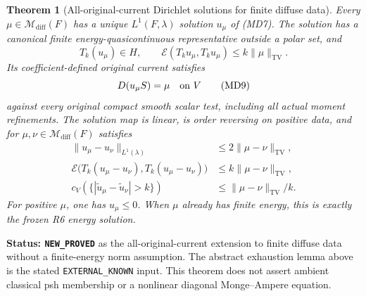 \documentclass[11pt,a4paper]{article}
\numberwithin{equation}{section}
\newtheorem{theorem}{Theorem}[section]
\theoremstyle{definition}
\theoremstyle{remark}
\begin{document}
\begin{theorem}[All-original-current Dirichlet solutions for finite diffuse data]
\label{thm:r11-diffuse-transposition-dirichlet}
Every $\mu\in\mathcal M_{\mathrm{diff}}(F)$ has a unique
$L^1(F,\lambda)$ solution $u_\mu$ of (MD7).  The solution has
a canonical finite energy-quasicontinuous representative
outside a polar set, and
\[
       T_k(u_\mu)\in H,\qquad
       \mathcal E(T_ku_\mu,T_ku_\mu)\leq k\|\mu\|_{\mathrm{TV}}.
 \tag{MD8}
\]
Its coefficient-defined original current satisfies
\[
                         D(u_\mu S)=\mu\quad\hbox{on }V
 \tag{MD9}
\]
against every original compact smooth scalar test, including
all actual moment refinements.
The solution map is linear, is order reversing on positive data,
and for $\mu,\nu\in\mathcal M_{\mathrm{diff}}(F)$ satisfies
\[
 \begin{split}
 \|u_\mu-u_\nu\|_{L^1(\lambda)}
                   &\leq2\|\mu-\nu\|_{\mathrm{TV}},\\
 \mathcal E\bigl(T_k(u_\mu-u_\nu),T_k(u_\mu-u_\nu)\bigr)
                   &\leq k\|\mu-\nu\|_{\mathrm{TV}},\\
 c_V(\{|\widetilde u_\mu-\widetilde u_\nu|>k\})
                   &\leq\|\mu-\nu\|_{\mathrm{TV}}/k.
 \end{split}
 \tag{MD10}
\]
For positive $\mu$, one has $u_\mu\leq0$.
When $\mu$ already has finite energy, this is exactly the
frozen R6 energy solution.
\end{theorem}

\noindent\textbf{Status: \texttt{NEW\_PROVED}} as the
all-original-current extension to finite diffuse data without a
finite-energy norm assumption.  The abstract exhaustion lemma
above is the stated \texttt{EXTERNAL\_KNOWN} input.
This theorem does not assert ambient classical psh membership
or a nonlinear diagonal Monge--Ampere equation.
\end{document}
